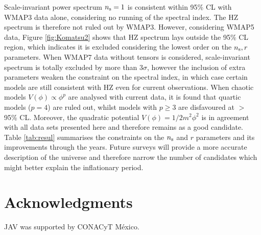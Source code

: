 \documentclass{rmaa}
\begin{document}
Scale-invariant power spectrum $n_{\rm s} = 1$ is consistent within 95\% CL with WMAP3 data 
alone, considering no running of the spectral index. The HZ spectrum 
is therefore not ruled out by WMAP3. However, considering WMAP5 data, 
Figure \ref{fig:Komatsu2} shows that HZ spectrum lays outside 
the 95\% CL region, which indicates it is excluded considering the lowest order 
on the $n_{\rm s}, r$ parameters. When WMAP7 data without tensors is considered, 
scale-invariant spectrum is totally excluded by more than $3 \sigma$, 
 however the inclusion of extra parameters weaken the constraint on the spectral index, in which case 
certain models are still consistent with HZ  even for current observations. 
When chaotic models $V(\phi)\propto\phi^p$ are analysed with current data, 
it is found that quartic models 
($p=4$) are ruled out, whilst models with $p\ge3$ are disfavoured at $>$ 95\% CL.
Moreover, the quadratic potential $V(\phi)= 1/2 m^2 \phi^2$ is in agreement
with all data sets presented here and therefore remains as a good candidate.
Table \ref{tab:resul} summarises the constraints on the $n_{\rm s}$ and $r$ parameters
and its improvements through the years.
Future surveys will  provide a more accurate description of the universe and therefore 
narrow the number of candidates which might better explain the inflationary period.



\section{Acknowledgments }

JAV was supported by CONACyT M\'exico.


%
\end{document}
